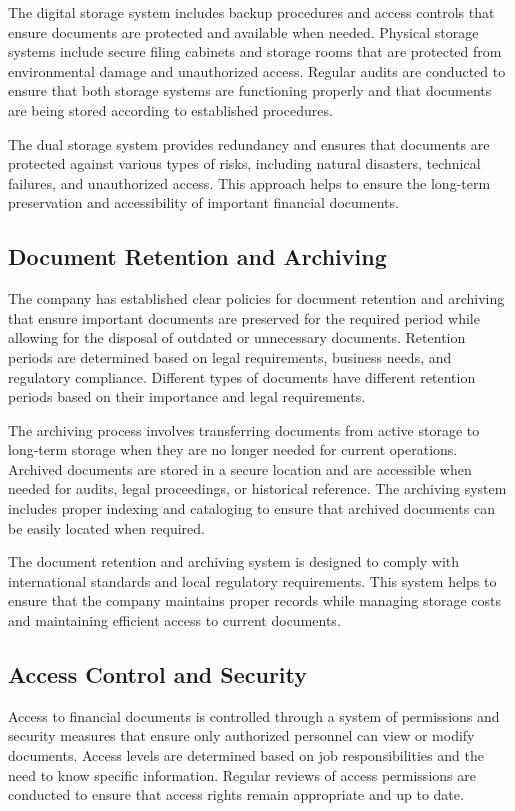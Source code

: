 The digital storage system includes backup procedures and access controls that ensure documents are protected and available when needed. Physical storage systems include secure filing cabinets and storage rooms that are protected from environmental damage and unauthorized access. Regular audits are conducted to ensure that both storage systems are functioning properly and that documents are being stored according to established procedures.

The dual storage system provides redundancy and ensures that documents are protected against various types of risks, including natural disasters, technical failures, and unauthorized access. This approach helps to ensure the long-term preservation and accessibility of important financial documents.

\subsection{Document Retention and Archiving}
The company has established clear policies for document retention and archiving that ensure important documents are preserved for the required period while allowing for the disposal of outdated or unnecessary documents. Retention periods are determined based on legal requirements, business needs, and regulatory compliance. Different types of documents have different retention periods based on their importance and legal requirements.

The archiving process involves transferring documents from active storage to long-term storage when they are no longer needed for current operations. Archived documents are stored in a secure location and are accessible when needed for audits, legal proceedings, or historical reference. The archiving system includes proper indexing and cataloging to ensure that archived documents can be easily located when required.

The document retention and archiving system is designed to comply with international standards and local regulatory requirements. This system helps to ensure that the company maintains proper records while managing storage costs and maintaining efficient access to current documents.

\subsection{Access Control and Security}
Access to financial documents is controlled through a system of permissions and security measures that ensure only authorized personnel can view or modify documents. Access levels are determined based on job responsibilities and the need to know specific information. Regular reviews of access permissions are conducted to ensure that access rights remain appropriate and up to date.

